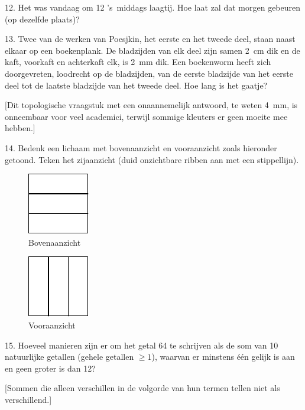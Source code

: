 \begin{problem}{12.}
	Het was vandaag om \SI{12}{\uur} 's~middags laagtij. Hoe laat zal dat morgen gebeuren (op dezelfde plaats)?
\end{problem}

\begin{problem}{13.}
	Twee van de werken van Poesjkin, het eerste en het tweede deel, staan naast elkaar op een boekenplank. De bladzijden van elk deel zijn samen \SI{2}{\cm} dik en de kaft, voorkaft en achterkaft elk, is \SI{2}{\mm} dik. Een boekenworm heeft zich doorgevreten, loodrecht op de bladzijden, van de eerste bladzijde van het eerste deel tot de laatste bladzijde van het tweede deel. Hoe lang is het gaatje?

	[Dit topologische vraagstuk met een onaannemelijk antwoord, te weten \SI{4}{\mm}, is onneembaar voor veel academici, terwijl sommige kleu\-ters er geen moeite mee hebben.]
\end{problem}

\clearpage

\begin{problem}{14.}
	Bedenk een lichaam met bovenaanzicht en vooraanzicht zoals hieronder getoond. Teken het zijaanzicht (duid onzichtbare ribben aan met een stippellijn).
	\begin{figure}
		\footnotesize
		\null\hfill
		\parbox{0.2\linewidth}{\centering\includegraphics{resources/taskbook-99}\\Bovenaanzicht}
		\hfill
		\parbox{0.2\linewidth}{\centering\includegraphics{resources/taskbook-98}\\Vooraanzicht}
		\hfill\null
	\end{figure}
\end{problem}

\begin{problem}{15.}
	Hoeveel manieren zijn er om het getal 64 te schrijven als de som van 10 natuurlijke getallen (gehele getallen $\geq 1$), waarvan er minstens één gelijk is aan en geen groter is dan 12?

	[Sommen die alleen verschillen in de volgorde van hun termen tellen niet als verschillend.]
\end{problem}

